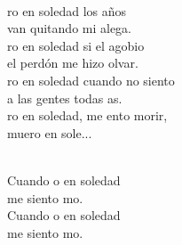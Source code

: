 \begin{cancion}
\begin{chorus}
	\end{chorus}%
	\jump\\
	ro en soledad los años  \\
	van quitando mi alega.\\
	ro en soledad si el agobio \\
	el perdón me hizo olvar.\\
	ro en soledad cuando no siento\\
	a las gentes todas as.\\
	ro en soledad, me ento morir, \\
	muero en sole...\\\jump\\
	\begin{chorus}%
	Cuando o en soledad \\
	me siento mo.\\
	Cuando o en soledad \\
	me siento mo. \\
	\end{chorus}%
	\jump\\
\end{cancion}%

